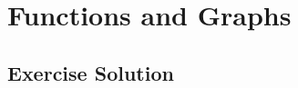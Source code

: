 \documentclass[11pt, letterpaper, oneside]{memoir}
\begin{document}
\chapter{Functions and Graphs}

\section*{Exercise Solution}


\end{document}
